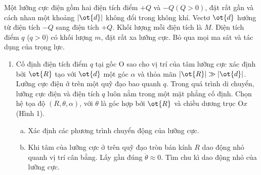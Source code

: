 \begin{vd}
    Một lưỡng cực điện gồm hai điện tích điểm $+{Q}$ và $-{Q} ({Q}>0)$, đặt rất gần và cách nhau một khoảng $|\ot{ {d}}|$ không đổi trong không khí. Vectơ $\ot{ {d}}$ hướng từ điện tích $- {Q}$ sang điện tích $+Q$. Khối lượng mỗi điện tích là $M$. Điện tích điểm $q$ ($q>0$) có khối lượng $m$, đặt rất xa lưỡng cực. Bỏ qua mọi ma sát và tác dụng của trọng lực.
    \begin{enumerate}[1)]
        \item Cố định điện tích điểm $q$ tại gốc $\mathrm{O}$ sao cho vị trí của tâm lưỡng cực xác định bởi $\ot{ {R}}$ tạo với $\ot{ {d}}$ một góc $\alpha $ và thỏa mãn $|\ot{ {R}}|\gg|\ot{ {d}}|$. Lưỡng cực điện ở trên một quỹ đạo bao quanh $q$. Trong quá trình di chuyển, lưỡng cực điện và điện tích $q$ luôn nằm trong một mặt phẳng cố định. Chọn hệ tọa độ $( {R},\theta ,\alpha )$, với $\theta $ là góc hợp bởi $\ot{ {R}}$ và chiều dương trục $\mathrm{O}x$ (Hình 1).
        \begin{enumerate}[a)]
            \item Xác định các phương trình chuyển động của lưỡng cực.
            \item Khi tâm của lưỡng cực ở trên quỹ đạo tròn bán kính $R$ dao động nhỏ quanh vị trí cân bằng. Lấy gần đúng $\ddot{\theta }\approx 0$. Tìm chu kì dao động nhỏ của lưỡng cực.
        \end{enumerate}
        \begin{center}
            



\begin{tikzpicture}[x=0.75pt,y=0.75pt,yscale=-1,xscale=1]


\end{tikzpicture}
\end{center}
\end{enumerate}
\end{vd}
